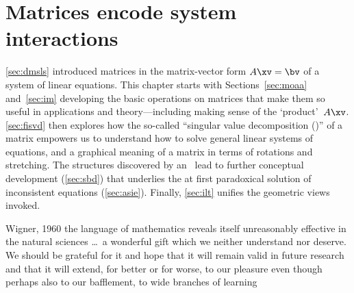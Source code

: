 
\chapter{Matrices encode system interactions}
\label{ch:m}

\minitoc




\autoref{sec:dmsls} introduced matrices in the matrix-vector form \(A\xv=\bv\) of a system of linear equations.
This chapter starts with Sections~\ref{sec:moaa} and~\ref{sec:im} developing the basic operations on matrices that make them so useful in applications and theory---including making sense of the `product'~\(A\xv\).
\autoref{sec:fisvd} then explores how the so-called ``singular value decomposition (\svd)'' of a matrix empowers us to understand how to solve general linear systems of equations, and a graphical meaning of a matrix in terms of rotations and stretching.
The structures discovered by an \svd\ lead to further conceptual development (\autoref{sec:sbd}) that underlies the at first paradoxical solution of inconsistent equations (\autoref{sec:asie}).
Finally, \autoref{sec:ilt} unifies the geometric views invoked.



\begin{quoted}{Wigner, 1960 \cite[p.3]{Mandelbrot1982}}
the language of mathematics reveals itself unreasonably effective in the natural sciences \ldots\ a wonderful gift which we neither understand nor deserve.  We should be grateful for it and hope that it will remain valid in future research and that it will extend, for better or for worse, to our pleasure even though perhaps also to our bafflement, to wide branches of learning
\end{quoted}



